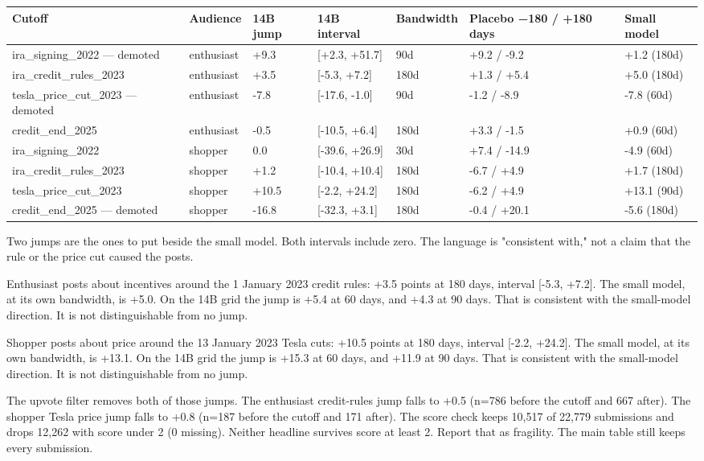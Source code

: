 \documentclass[11pt]{article}
\begin{document}
\begin{longtable}{lllllll}
\toprule
Cutoff & Audience & 14B jump & 14B interval & Bandwidth & Placebo −180 / +180 days & Small model \\
\midrule
ira\_signing\_2022 — demoted & enthusiast & +9.3 & [+2.3, +51.7] & 90d & +9.2 / -9.2 & +1.2 (180d) \\
ira\_credit\_rules\_2023 & enthusiast & +3.5 & [-5.3, +7.2] & 180d & +1.3 / +5.4 & +5.0 (180d) \\
tesla\_price\_cut\_2023 — demoted & enthusiast & -7.8 & [-17.6, -1.0] & 90d & -1.2 / -8.9 & -7.8 (60d) \\
credit\_end\_2025 & enthusiast & -0.5 & [-10.5, +6.4] & 180d & +3.3 / -1.5 & +0.9 (60d) \\
ira\_signing\_2022 & shopper & 0.0 & [-39.6, +26.9] & 30d & +7.4 / -14.9 & -4.9 (60d) \\
ira\_credit\_rules\_2023 & shopper & +1.2 & [-10.4, +10.4] & 180d & -6.7 / +4.9 & +1.7 (180d) \\
tesla\_price\_cut\_2023 & shopper & +10.5 & [-2.2, +24.2] & 180d & -6.2 / +4.9 & +13.1 (90d) \\
credit\_end\_2025 — demoted & shopper & -16.8 & [-32.3, +3.1] & 180d & -0.4 / +20.1 & -5.6 (180d) \\
\bottomrule
\end{longtable}


Two jumps are the ones to put beside the small model. Both intervals include zero. The language is "consistent with," not a claim that the rule or the price cut caused the posts.


Enthusiast posts about incentives around the 1 January 2023 credit rules: +3.5 points at 180 days, interval [-5.3, +7.2]. The small model, at its own bandwidth, is +5.0. On the 14B grid the jump is +5.4 at 60 days, and +4.3 at 90 days. That is consistent with the small-model direction. It is not distinguishable from no jump.


Shopper posts about price around the 13 January 2023 Tesla cuts: +10.5 points at 180 days, interval [-2.2, +24.2]. The small model, at its own bandwidth, is +13.1. On the 14B grid the jump is +15.3 at 60 days, and +11.9 at 90 days. That is consistent with the small-model direction. It is not distinguishable from no jump.


The upvote filter removes both of those jumps. The enthusiast credit-rules jump falls to +0.5 (n=786 before the cutoff and 667 after). The shopper Tesla price jump falls to +0.8 (n=187 before the cutoff and 171 after). The score check keeps 10,517 of 22,779 submissions and drops 12,262 with score under 2 (0 missing). Neither headline survives score at least 2. Report that as fragility. The main table still keeps every submission.
\end{document}
